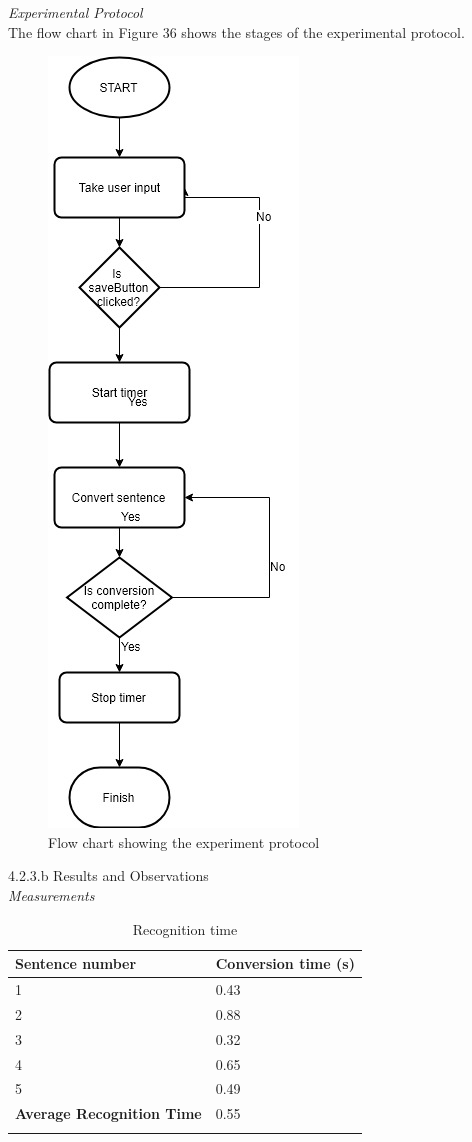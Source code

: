 \textit{Experimental Protocol}\\
The flow chart in Figure 36 shows the stages of the experimental protocol. 
\begin{figure}[h]
	\centering
	\includegraphics[scale=0.55]{50}
	\caption{Flow chart showing the experiment protocol}
\end{figure}

4.2.3.b Results and Observations\\
\textit{Measurements}\\
\begin{center}
	\begin{longtable}{|p{5cm}|p{5cm}|}
		\hline
		\textbf{Sentence number} &
		\textbf{Conversion time (s)} \\
		\hline
		1
		&
		0.43
		\\
		\hline
		2
		&
		0.88
		\\
		\hline
		3
		&
		0.32
		\\
		\hline
		4
		&
		0.65
		\\
		\hline
		5
		&
		0.49
		\\
		\hline
		\textbf{Average Recognition Time}
		&
		0.55
		\\
		\hline		
		\caption{Recognition time}
	\end{longtable}
\end{center}

